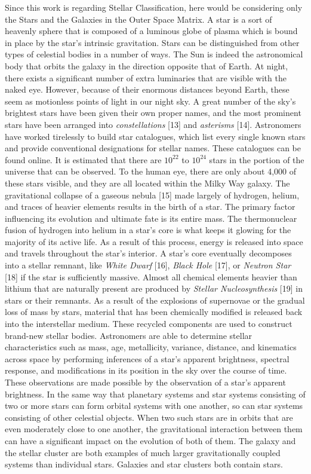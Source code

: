 \documentclass[conference]{IEEEtran}
\begin{document}
Since this work is regarding Stellar Classification, here would be considering only the Stars and the Galaxies in the Outer Space Matrix. A star is a sort of heavenly sphere that is composed of a luminous globe of plasma which is bound in place by the star's intrinsic gravitation. Stars can be distinguished from other types of celestial bodies in a number of ways. The Sun is indeed the astronomical body that orbits the galaxy in the direction opposite that of Earth. At night, there exists a significant number of extra luminaries that are visible with the naked eye. However, because of their enormous distances beyond Earth, these seem as motionless points of light in our night sky. A great number of the sky's brightest stars have been given their own proper names, and the most prominent stars have been arranged into \textit{constellations} [13] and \textit{asterisms} [14]. Astronomers have worked tirelessly to build star catalogues, which list every single known stars and provide conventional designations for stellar names. These catalogues can be found online. It is estimated that there are $10^{22}$ to $10^{24}$ stars in the portion of the universe that can be observed. To the human eye, there are only about 4,000 of these stars visible, and they are all located within the Milky Way galaxy. The gravitational collapse of a gaseous nebula [15] made largely of hydrogen, helium, and traces of heavier elements results in the birth of a star. The primary factor influencing its evolution and ultimate fate is its entire mass. The thermonuclear fusion of hydrogen into helium in a star's core is what keeps it glowing for the majority of its active life. As a result of this process, energy is released into space and travels throughout the star's interior. A star's core eventually decomposes into a stellar remnant, like \textit{White Dwarf} [16], \textit{Black Hole} [17], or \textit{Neutron Star} [18] if the star is sufficiently massive. Almost all chemical elements heavier than lithium that are naturally present are produced by \textit{Stellar Nucleosynthesis} [19] in stars or their remnants. As a result of the explosions of supernovae or the gradual loss of mass by stars, material that has been chemically modified is released back into the interstellar medium. These recycled components are used to construct brand-new stellar bodies. Astronomers are able to determine stellar characteristics such as mass, age, metallicity, variance, distance, and kinematics across space by performing inferences of a star's apparent brightness, spectral response, and modifications in its position in the sky over the course of time. These observations are made possible by the observation of a star's apparent brightness. In the same way that planetary systems and star systems consisting of two or more stars can form orbital systems with one another, so can star systems consisting of other celestial objects. When two such stars are in orbits that are even moderately close to one another, the gravitational interaction between them can have a significant impact on the evolution of both of them. The galaxy and the stellar cluster are both examples of much larger gravitationally coupled systems than individual stars. Galaxies and star clusters both contain stars. \\
\end{document}
